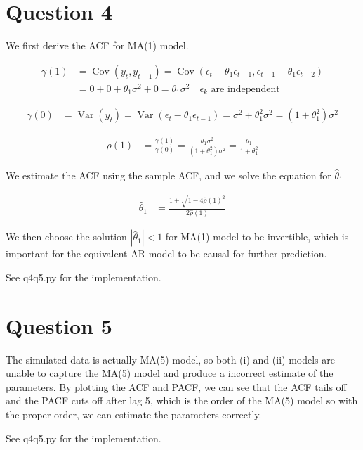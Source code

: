 \documentclass{article}
\DeclareMathOperator{\Cov}{Cov}
\DeclareMathOperator{\Var}{Var}
\begin{document}
\section*{Question 4}

We first derive the ACF for MA(1) model.

\begin{align*}
  \gamma(1) &= \Cov(y_t, y_{t-1}) = \Cov(\epsilon_t - \theta_1 \epsilon_{t-1}, \epsilon_{t-1} - \theta_1 \epsilon_{t-2}) \\
  &= 0 + 0 + \theta_1 \sigma^2 + 0 = \theta_1 \sigma^2 \quad \epsilon_{k} \text{ are independent}
\end{align*}

\begin{align*}
  \gamma(0) &= \Var(y_t) = \Var(\epsilon_t - \theta_1 \epsilon_{t-1}) = \sigma^2 + \theta_1^2 \sigma^2 = (1 + \theta_1^2) \sigma^2
\end{align*}

\begin{align*}
  \rho(1) &= \frac{\gamma(1)}{\gamma(0)} = \frac{\theta_1 \sigma^2}{(1 + \theta_1^2) \sigma^2} = \frac{\theta_1}{1 + \theta_1^2}
\end{align*}

We estimate the ACF using the sample ACF, and we solve the equation for $\hat \theta_1$ 

\begin{align*}
  \hat \theta_1 &= \frac{1 \pm \sqrt{1 - 4 \hat \rho(1)^2}}{2 \hat \rho(1)}
\end{align*}

We then choose the solution $|\hat \theta_1| < 1$ for MA(1) model to be invertible, which is important for the equivalent AR model to be causal for further prediction.

See q4q5.py for the implementation.

\section*{Question 5}

The simulated data is actually MA(5) model, so both (i) and (ii) models are unable to capture the MA(5) model and produce a incorrect estimate of the parameters. By plotting the ACF and PACF, we can see that the ACF tails off and the PACF cuts off after lag 5, which is the order of the MA(5) model so with the proper order, we can estimate the parameters correctly.

See q4q5.py for the implementation.
\end{document}
